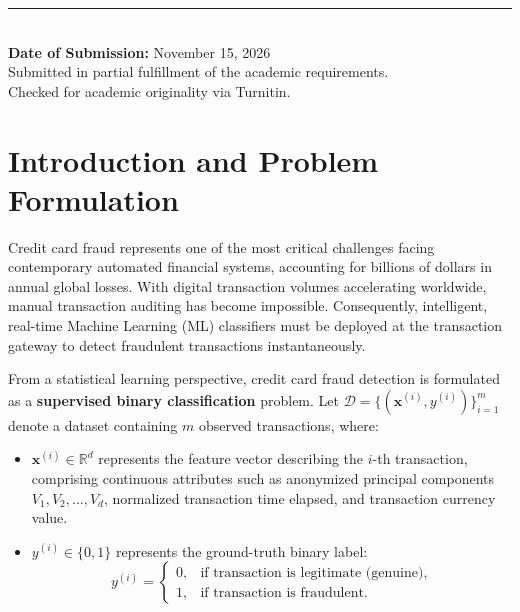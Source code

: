 \documentclass[11pt,a4paper]{article}
\begin{document}
\begin{titlepage}
    \vfill
    \rule{\linewidth}{0.4mm}\\[0.3cm]
    {\large \textbf{Date of Submission:} November 15, 2026}\\[0.2cm]
    {\small Submitted in partial fulfillment of the academic requirements.}\\
    {\small Checked for academic originality via Turnitin.}
    
\end{titlepage}

\newpage
\tableofcontents
\newpage

\section{Introduction and Problem Formulation}
\label{sec:introduction}

Credit card fraud represents one of the most critical challenges facing contemporary automated financial systems, accounting for billions of dollars in annual global losses. With digital transaction volumes accelerating worldwide, manual transaction auditing has become impossible. Consequently, intelligent, real-time Machine Learning (ML) classifiers must be deployed at the transaction gateway to detect fraudulent transactions instantaneously.

From a statistical learning perspective, credit card fraud detection is formulated as a \textbf{supervised binary classification} problem. Let $\mathcal{D} = \{(\mathbf{x}^{(i)}, y^{(i)})\}_{i=1}^m$ denote a dataset containing $m$ observed transactions, where:
\begin{itemize}
    \item $\mathbf{x}^{(i)} \in \mathbb{R}^d$ represents the feature vector describing the $i$-th transaction, comprising continuous attributes such as anonymized principal components $V_1, V_2, \dots, V_d$, normalized transaction time elapsed, and transaction currency value.
    \item $y^{(i)} \in \{0, 1\}$ represents the ground-truth binary label:
    \begin{equation}
        y^{(i)} = \begin{cases}
            0, & \text{if transaction is legitimate (genuine)}, \\
            1, & \text{if transaction is fraudulent}.
        \end{cases}
    \end{equation}
\end{itemize}
\end{document}
